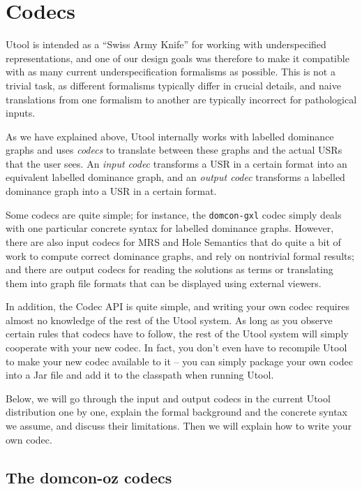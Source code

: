 
\section{Codecs}  \label{sec:codecs}

Utool is intended as a ``Swiss Army Knife'' for working with
underspecified representations, and one of our design goals was
therefore to make it compatible with as many current
underspecification formalisms as possible. This is not a trivial task,
as different formalisms typically differ in crucial details, and naive
translations from one formalism to another are typically incorrect for
pathological inputs.

As we have explained above, Utool internally works with labelled
dominance graphs and uses \emph{codecs} to translate between these
graphs and the actual USRs that the user sees. An \emph{input codec}
transforms a USR in a certain format into an equivalent labelled
dominance graph, and an \emph{output codec} transforms a labelled
dominance graph into a USR in a certain format. 

Some codecs are quite simple; for instance, the \verb?domcon-gxl?
codec simply deals with one particular concrete syntax for labelled
dominance graphs. However, there are also input codecs for MRS and
Hole Semantics that do quite a bit of work to compute correct
dominance graphs, and rely on nontrivial formal results; and there are
output codecs for reading the solutions as terms or translating them
into graph file formats that can be displayed using external viewers.

In addition, the Codec API is quite simple, and writing your own codec
requires almost no knowledge of the rest of the Utool system. As
long as you observe certain rules that codecs have to follow, the rest of the Utool system will simply cooperate with
your new codec. In fact, you don't even have to recompile Utool to
make your new codec available to it -- you can simply package your own
codec into a Jar file and add it to the classpath when running Utool.

Below, we will go through the input and output codecs in the current
Utool distribution one by one, explain the formal background and the
concrete syntax we assume, and discuss their limitations. Then we will
explain how to write your own codec.



\subsection{The domcon-oz codecs}

